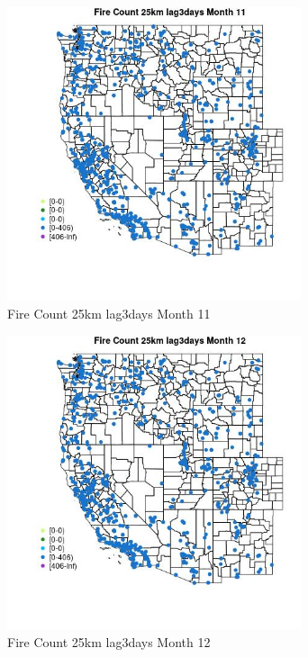 \begin{figure} 
\centering  
\includegraphics[width=0.77\textwidth]{Code_Outputs/Report_ML_input_PM25_Step4_part_f_de_duplicated_aves_prioritize_24hr_obswNAs_MapObsMo11Fire_Count_25km_lag3days.jpg} 
\caption{\label{fig:Report_ML_input_PM25_Step4_part_f_de_duplicated_aves_prioritize_24hr_obswNAsMapObsMo11Fire_Count_25km_lag3days}Fire Count 25km lag3days Month 11} 
\end{figure} 
 

\begin{figure} 
\centering  
\includegraphics[width=0.77\textwidth]{Code_Outputs/Report_ML_input_PM25_Step4_part_f_de_duplicated_aves_prioritize_24hr_obswNAs_MapObsMo12Fire_Count_25km_lag3days.jpg} 
\caption{\label{fig:Report_ML_input_PM25_Step4_part_f_de_duplicated_aves_prioritize_24hr_obswNAsMapObsMo12Fire_Count_25km_lag3days}Fire Count 25km lag3days Month 12} 
\end{figure} 
 

